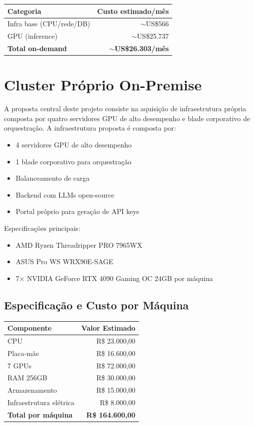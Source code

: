\documentclass[12pt,a4paper,]{abntex2}
\begin{document}
\begin{table}[h]
\centering
\begin{tabular}{|l|r|}
\hline
\textbf{Categoria} & \textbf{Custo estimado/mês} \\
\hline
Infra base (CPU/rede/DB) & $\sim$US\$566 \\
GPU (inference) & $\sim$US\$25.737 \\
\hline
\textbf{Total on-demand} & \textbf{$\sim$US\$26.303/mês} \\
\hline
\end{tabular}
\end{table}
\newpage

\newpage
\section{Cluster Próprio On-Premise}
A proposta central deste projeto consiste na aquisição de infraestrutura própria composta por quatro servidores GPU de alto desempenho e blade corporativo de orquestração.
A infraestrutura proposta é composta por:

\begin{itemize}
\item 4 servidores GPU de alto desempenho
\item 1 blade corporativo para orquestração
\item Balanceamento de carga
\item Backend com LLMs open-source
\item Portal próprio para geração de API keys
\end{itemize}

Especificações principais:

\begin{itemize}
\item AMD Ryzen Threadripper PRO 7965WX
\item ASUS Pro WS WRX90E-SAGE
\item 7× NVIDIA GeForce RTX 4090 Gaming OC 24GB por máquina
\end{itemize}

\subsection{Especificação e Custo por Máquina}

\begin{table}[h]
\centering
\begin{tabular}{|l|r|}
\hline
\textbf{Componente} & \textbf{Valor Estimado} \\
\hline
CPU & R\$ 23.000,00 \\
Placa-mãe & R\$ 16.600,00 \\
7 GPUs & R\$ 72.000,00 \\
RAM 256GB & R\$ 30.000,00 \\
Armazenamento & R\$ 15.000,00 \\
Infraestrutura elétrica & R\$ 8.000,00 \\
\hline
\textbf{Total por máquina} & \textbf{R\$ 164.600,00} \\
\hline
\end{tabular}
\end{table}
\end{document}
